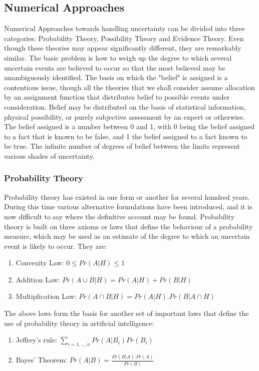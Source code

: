 \documentclass[UTF8]{article}
\begin{document}
\subsection{Numerical Approaches}
Numerical Approaches towards handling uncertainty can be divided into three categories: Probability Theory, Possibility Theory and Evidence Theory. Even though these theories may appear significantly different, they are remarkably similar. The basic problem is how to weigh up the degree to which several uncertain
events are believed to occur so that the most believed may be unambiguously identified. The basis on which the "belief" is assigned is a contentious issue,
though all the theories that we shall consider assume allocation by an assignment
function that distributes belief to possible events under consideration. Belief may
be distributed on the basis of statistical information, physical possibility, or purely subjective assessment by an expert or otherwise. The belief
assigned is a number between 0 and 1, with 0 being the belief assigned to a fact
that is known to be false, and 1 the belief assigned to a fact known to be
true. The infinite number of degrees of belief between the limits represent various
shades of uncertainty.\\
\subsubsection{Probability Theory}
Probability theory has existed in one form or another for several hundred years.
During this time various alternative formulations have been introduced, and it 
is now difficult to say where the definitive account may be found. Probability theory is built on three axioms or laws that define the behaviour of a probability measure, which may be
used as an estimate of the degree to which an uncertain event is likely to occur. They are:
\begin{enumerate}[i]
    \item {Convexity Law: $0 \leq Pr(A | H) \leq 1$}
    \item {Addition Law: $Pr(A \cup B |  H) = Pr(A | H) + Pr(B | H)$}
    \item {Multiplication Law: $Pr(A \cap B | H) = Pr(A | H) . Pr(B | A \cap H)$}
\end{enumerate}
The above laws form the basis for another set of important laws that define the use of probability theory in artificial intelligence:
\begin{enumerate}[i]
    \item {Jeffrey's rule: $\sum\limits_{i = 1, ..., n}Pr(A|B_i)Pr(B_i)$}
    \item {Bayes' Theorem: $Pr(A|B) = \frac{Pr(B|A) . Pr(A)}{Pr(B)}$}
\end{enumerate}
\end{document}
